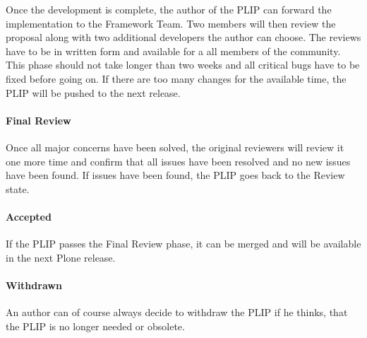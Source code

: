 Once the development is complete, the author of the \ac{PLIP} can forward the
implementation to the Framework Team. Two members will then review the proposal
along with two additional developers the author can choose. The reviews have to
be in written form and available for a all members of the community. This phase
should not take longer than two weeks and all critical bugs have to be fixed
before going on. If there are too many changes for the available time, the
\ac{PLIP} will be pushed to the next release.

\paragraph{Final Review}

Once all major concerns have been solved, the original reviewers will review it
one more time and confirm that all issues have been resolved and no new issues
have been found. If issues have been found, the \ac{PLIP} goes back to the
Review state.

\paragraph{Accepted}

If the \ac{PLIP} passes the Final Review phase, it can be merged and will be
available in the next Plone release.

\paragraph{Withdrawn}

An author can of course always decide to withdraw the \ac{PLIP} if he thinks,
that the \ac{PLIP} is no longer needed or obsolete.


